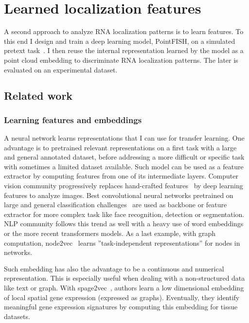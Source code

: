 \section{Learned localization features}
\label{sec:learned_features}

A second approach to analyze \ac{RNA} localization patterns is to learn features.
To this end I design and train a deep learning model, PointFISH, on a simulated pretext task~\cite{pointfish_2022}.
I then reuse the internal representation learned by the model as a point cloud embedding to discriminate \ac{RNA} localization patterns.
The later is evaluated on an experimental dataset.

\subsection{Related work}
\label{subsec:related_work_learned_features}

\subsubsection{Learning features and embeddings}

A neural network learns representations that I can use for transfer learning.
One advantage is to pretrained relevant representations on a first task with a large and general annotated dataset, before addressing a more difficult or specific task with sometimes a limited dataset available.
Such model can be used as a feature extractor by computing features from one of its intermediate layers.
Computer vision community progressively replaces hand-crafted features~\cite{Lowe_1999,Bay_2006} by deep learning features to analyze images.
Best convolutional neural networks pretrained on large and general classification challenges~\cite{He_2016_CVPR,Szegedy_2016_CVPR,Tan_2019,Huang_2017_CVPR} are used as backbone or feature extractor for more complex task like face recognition, detection or segmentation.
NLP community follows this trend as well with a heavy use of word embeddings~\cite{Mikolov_2013,Joulin_2016} or the more recent transformers models.
As a last example, with graph computation, node2vec~\cite{Grover_2016} learns ''task-independent representations'' for nodes in networks.

Such embedding has also the advantage to be a continuous and numerical representation.
This is especially useful when dealing with a non-structured data like text or graph.
With spage2vec~\cite{Partel_2021}, authors learn a low dimensional embedding of local spatial gene expression (expressed as graphs).
Eventually, they identify meaningful gene expression signatures by computing this embedding for tissue datasets.

